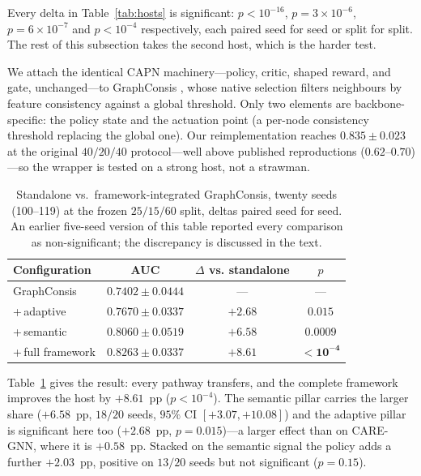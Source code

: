 \documentclass{conf}
\begin{document}
\noindent Every delta in Table~\ref{tab:hosts} is significant: $p<10^{-16}$,
$p=3\times10^{-6}$, $p=6\times10^{-7}$ and $p<10^{-4}$ respectively, each
paired seed for seed or split for split. The rest of this subsection takes the
second host, which is the harder test.

We attach the identical CAPN machinery---policy, critic, shaped reward,
and gate, unchanged---to GraphConsis \cite{liu2020alleviating}, whose native
selection filters neighbours by feature consistency against a global threshold.
Only two elements are backbone-specific: the policy state and the actuation
point (a per-node consistency threshold replacing the global one). Our
reimplementation reaches $0.835 \pm 0.023$ at the original $40/20/40$
protocol---well above published reproductions ($0.62$--$0.70$)---so the wrapper
is tested on a strong host, not a strawman.

\begin{table}[t]
\centering
\small
\setlength{\tabcolsep}{4pt}
\caption{Standalone vs.\ framework-integrated GraphConsis, twenty seeds
(100--119) at the frozen $25/15/60$ split, deltas paired seed for seed. An
earlier five-seed version of this table reported every comparison as
non-significant; the discrepancy is discussed in the text.}
\label{tab:wrapper}
\begin{tabularx}{\linewidth}{@{}>{\raggedright\arraybackslash}Xccc@{}}
\toprule
Configuration & AUC & \shortstack{$\Delta$ vs.\\ standalone} & $p$ \\
\midrule
GraphConsis          & $0.7402 \pm 0.0444$ & --- & --- \\
\;+\,adaptive        & $0.7670 \pm 0.0337$ & $+2.68$ & $0.015$ \\
\;+\,semantic        & $0.8060 \pm 0.0519$ & $+6.58$ & $0.0009$ \\
\;+\,full framework  & $\mathbf{0.8263 \pm 0.0337}$ & $\mathbf{+8.61}$ & $\mathbf{<10^{-4}}$ \\
\bottomrule
\end{tabularx}
\end{table}

Table~\ref{tab:wrapper} gives the result: every pathway transfers, and the
complete framework improves the host by $+8.61$~pp ($p<10^{-4}$). The semantic
pillar carries the larger share ($+6.58$~pp, $18/20$ seeds, $95\%$ CI
$[+3.07,+10.08]$) and the adaptive pillar is significant here too
($+2.68$~pp, $p=0.015$)---a larger effect than on CARE-GNN, where it is
$+0.58$~pp. Stacked on the semantic signal the policy adds a further
$+2.03$~pp, positive on $13/20$ seeds but not significant ($p=0.15$).
\end{document}

